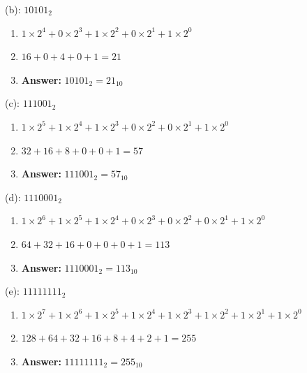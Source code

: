 \documentclass{article}
\begin{document}
\vspace*{0.5cm}

\noindent (b): $10101_2$

\begin{enumerate}
    \item $1 \times 2^4 + 0 \times 2^3 + 1 \times 2^2 + 0 \times 2^1 + 1 \times 2^0$
    \item $16 + 0 + 4 + 0 + 1 = 21$
    \item \textbf{Answer:} $10101_2 = 21_{10}$
\end{enumerate}

\vspace*{0.5cm}

\noindent (c): $111001_2$

\begin{enumerate}
    \item $1 \times 2^5 + 1 \times 2^4 + 1 \times 2^3 + 0 \times 2^2 + 0 \times 2^1 + 1 \times 2^0$
    \item $32 + 16 + 8 + 0 + 0 + 1 = 57$
    \item \textbf{Answer:} $111001_2 = 57_{10}$
\end{enumerate}

\vspace*{0.5cm}

\noindent (d): $1110001_2$

\begin{enumerate}
    \item $1 \times 2^6 + 1 \times 2^5 + 1 \times 2^4 + 0 \times 2^3 + 0 \times 2^2 + 0 \times 2^1 + 1 \times 2^0$
    \item $64 + 32 + 16 + 0 + 0 + 0 + 1 = 113$
    \item \textbf{Answer:} $1110001_2 = 113_{10}$
\end{enumerate}

\vspace*{0.5cm}

\noindent (e): $11111111_2$

\begin{enumerate}
    \item $1 \times 2^7 + 1 \times 2^6 + 1 \times 2^5 + 1 \times 2^4 + 1 \times 2^3 + 1 \times 2^2 + 1 \times 2^1 + 1 \times 2^0$
    \item $128 + 64 + 32 + 16 + 8 + 4 + 2 + 1 = 255$
    \item \textbf{Answer:} $11111111_2 = 255_{10}$
\end{enumerate}

\newpage
\end{document}
